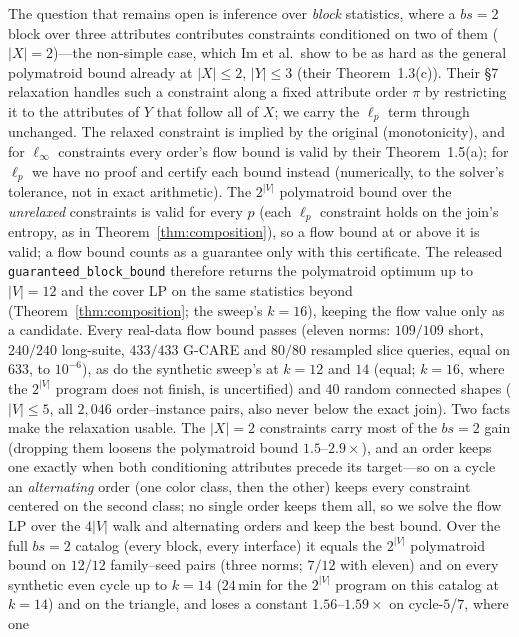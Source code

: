 \documentclass[sigconf, nonacm, acmthm=false]{acmart}
\begin{document}
The question that remains open is inference over \emph{block}
statistics, where a $bs{=}2$ block over three attributes contributes
constraints conditioned on two of them ($|X|{=}2$)---the non-simple
case, which Im et al.\ show to be as hard as the general polymatroid
bound already at $|X| \le 2$, $|Y| \le 3$ (their Theorem~1.3(c)). Their
\S7 relaxation handles such a constraint along a fixed attribute order
$\pi$ by restricting it to the attributes of $Y$ that follow all of $X$;
we carry the $\ell_p$ term through unchanged. The relaxed constraint is
implied by the original (monotonicity), and for $\ell_\infty$ constraints
every order's flow bound is valid by their Theorem~1.5(a); for $\ell_p$
we have no proof and certify each bound instead (numerically, to the solver's tolerance, not in exact arithmetic). The $2^{|V|}$
polymatroid bound over the \emph{unrelaxed} constraints is valid for
every $p$ (each $\ell_p$ constraint holds on the join's entropy, as in
Theorem~\ref{thm:composition}), so a flow bound at or above it is valid; a flow bound counts as a guarantee only with this certificate. The released \texttt{guaranteed\_block\_bound} therefore returns the polymatroid optimum up to $|V|{=}12$ and the cover LP on the same statistics beyond (Theorem~\ref{thm:composition}; the sweep's $k{=}16$), keeping the flow value only as a candidate.
Every real-data flow bound passes (eleven norms: $109/109$ short,
$240/240$ long-suite, $433/433$ G-CARE and $80/80$ resampled slice
queries, equal on $633$, to $10^{-6}$), as do the synthetic sweep's at
$k{=}12$ and $14$ (equal; $k{=}16$, where the $2^{|V|}$ program does not
finish, is uncertified) and $40$ random connected shapes ($|V| \le 5$, all
$2{,}046$ order--instance pairs, also never below the exact join). Two facts make the
relaxation usable. The
$|X|{=}2$ constraints carry most of the $bs{=}2$ gain (dropping them
loosens the polymatroid bound $1.5$--$2.9\times$), and an order keeps
one exactly when both conditioning attributes precede its target---so on
a cycle an \emph{alternating} order (one color class, then the other)
keeps every constraint centered on the second class; no single order
keeps them all, so we solve the flow LP over the $4|V|$ walk and
alternating orders and keep the best bound. Over the full $bs{=}2$ catalog
(every block, every interface) it equals the $2^{|V|}$ polymatroid bound
on $12/12$ family--seed pairs (three norms; $7/12$ with eleven) and on every synthetic even cycle up to $k{=}14$ ($24$\,min for the $2^{|V|}$ program on this catalog at $k{=}14$) and on
the triangle,
and loses a constant $1.56$--$1.59\times$ on cycle-$5$/$7$, where one
\end{document}
